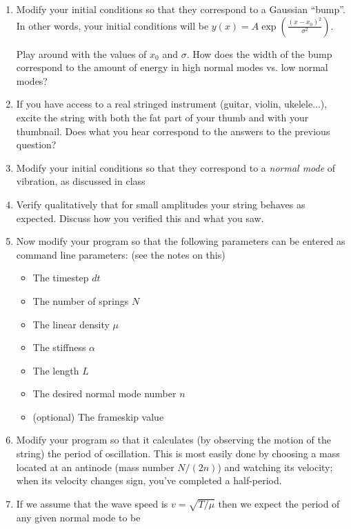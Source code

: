 \documentclass[12pt]{article}
\begin{document}
\begin{enumerate}

\item Modify your initial conditions so that they correspond to a Gaussian ``bump''. In other words, your initial conditions will be $y(x) = A \exp \left( \frac{(x-x_0)^2}{\sigma^2} \right).$

Play around with the values of $x_0$ and $\sigma$. How does the width of the bump correspond to the amount of energy in high normal modes vs. low normal modes?

\item If you have access to a real stringed instrument (guitar, violin, ukelele...), excite the string with both the fat part of your thumb and with your thumbnail. Does what you hear correspond to the answers
to the previous question?

\item{Modify your initial conditions so that they correspond to a {\it normal mode} of vibration, as discussed in class}
\item{Verify qualitatively that for small amplitudes your string behaves as expected. Discuss how you verified this and what you saw.}
\item Now modify your program so that the following parameters can be entered as command line parameters: (see the notes on this)

\begin{itemize}
\item The timestep $dt$
\item The number of springs $N$
\item The linear density $\mu$
\item The stiffness $\alpha$
\item The length $L$
\item The desired normal mode number $n$
\item (optional) The frameskip value
\end{itemize}

\item Modify your program so that it calculates (by observing the motion of the string) the period of oscillation. This is most easily done by choosing a mass located at an antinode
(mass number $N/(2n)$) and watching its velocity; when its velocity changes sign, you've completed a half-period. 

\item If we assume that the wave speed is $v=\sqrt{T/\mu}$ then we expect the period of any given normal mode to be


\end{enumerate}
\end{document}
